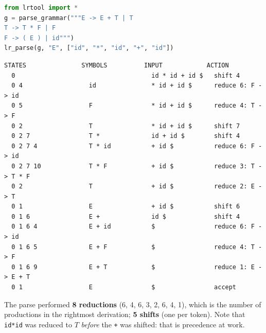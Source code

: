 \documentclass[10pt,a4paper,openany,oneside]{report}
\begin{document}
\begin{lstlisting}[language={Python},title={LR parse of  id * id + id : each reduce is one step of a rightmost derivation (in reverse)}]
from lrtool import *
g = parse_grammar("""E -> E + T | T
T -> T * F | F
F -> ( E ) | id""")
lr_parse(g, "E", ["id", "*", "id", "+", "id"])
\end{lstlisting}
\begin{lstlisting}[style=out,title={Captured output}]
  STATES               SYMBOLS          INPUT            ACTION
  0                                     id * id + id $   shift 4
  0 4                  id               * id + id $      reduce 6: F -> id
  0 5                  F                * id + id $      reduce 4: T -> F
  0 2                  T                * id + id $      shift 7
  0 2 7                T *              id + id $        shift 4
  0 2 7 4              T * id           + id $           reduce 6: F -> id
  0 2 7 10             T * F            + id $           reduce 3: T -> T * F
  0 2                  T                + id $           reduce 2: E -> T
  0 1                  E                + id $           shift 6
  0 1 6                E +              id $             shift 4
  0 1 6 4              E + id           $                reduce 6: F -> id
  0 1 6 5              E + F            $                reduce 4: T -> F
  0 1 6 9              E + T            $                reduce 1: E -> E + T
  0 1                  E                $                accept
\end{lstlisting}
The parse performed \textbf{8 reductions} (6, 4, 6, 3, 2, 6, 4, 1), which is the number of productions in the rightmost derivation; \textbf{5 shifts} (one per token). Note that \texttt{id*id} was reduced to $T$ \emph{before} the \texttt{+} was shifted: that is precedence at work.
\end{document}
